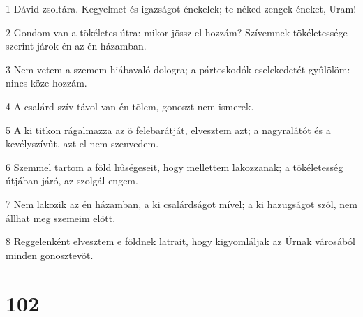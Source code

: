 \par 1 Dávid zsoltára. Kegyelmet és igazságot énekelek; te néked zengek éneket, Uram!
\par 2 Gondom van a tökéletes útra: mikor jössz el hozzám? Szívemnek tökéletessége szerint járok én az én házamban.
\par 3 Nem vetem a szemem hiábavaló dologra; a pártoskodók cselekedetét gyûlölöm: nincs köze hozzám.
\par 4 A csalárd szív távol van én tõlem, gonoszt nem ismerek.
\par 5 A ki titkon rágalmazza az õ felebarátját, elvesztem azt; a nagyralátót és a kevélyszívût, azt el nem szenvedem.
\par 6 Szemmel tartom a föld hûségeseit, hogy mellettem lakozzanak; a tökéletesség útjában járó, az szolgál engem.
\par 7 Nem lakozik az én házamban, a ki csalárdságot mível; a ki hazugságot szól, nem állhat meg szemeim elõtt.
\par 8 Reggelenként elvesztem e földnek latrait, hogy kigyomláljak az Úrnak városából minden gonosztevõt.

\chapter{102}

